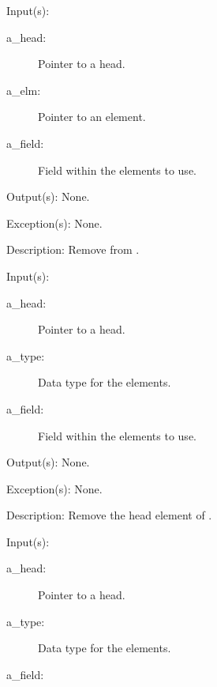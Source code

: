 \begin{capi}
\begin{capilist}
	\item[Input(s): ]
		\begin{description}\item[]
		\item[a\_head: ]
			Pointer to a  head.
		\item[a\_elm: ]
			Pointer to an element.
		\item[a\_field: ]
			Field within the  elements to use.
		\end{description}
	\item[Output(s): ] None.
	\item[Exception(s): ] None.
	\item[Description: ]
		Remove  from .
	\end{capilist}
\label{ql_head_remove}
	\begin{capilist}
	\item[Input(s): ]
		\begin{description}\item[]
		\item[a\_head: ]
			Pointer to a  head.
		\item[a\_type: ]
			Data type for the  elements.
		\item[a\_field: ]
			Field within the  elements to use.
		\end{description}
	\item[Output(s): ] None.
	\item[Exception(s): ] None.
	\item[Description: ]
		Remove the head element of .
	\end{capilist}
\label{ql_tail_remove}
	\begin{capilist}
	\item[Input(s): ]
		\begin{description}\item[]
		\item[a\_head: ]
			Pointer to a \classname{ql} head.
		\item[a\_type: ]
			Data type for the  elements.
		\item[a\_field: ]

\end{description}
\end{capilist}
\end{capi}
